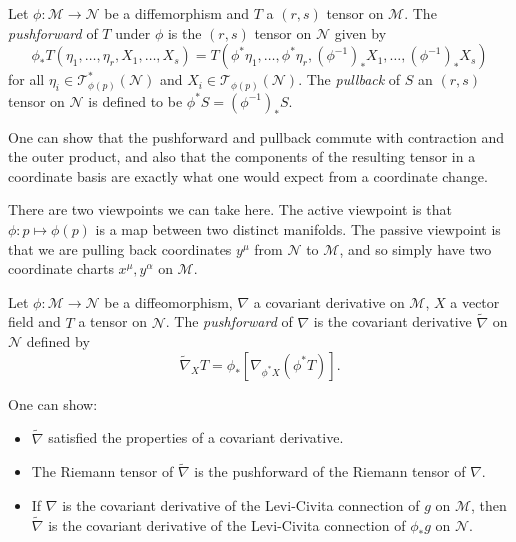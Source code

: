 \documentclass{jknotes}
\begin{document}
\begin{defn}
    Let \(\phi:\mathcal{M}\to\mathcal{N}\) be a diffemorphism and \(T\) a \((r,s)\) tensor on \(\mathcal{M}\). The \emph{pushforward} of \(T\) under \(\phi\) is the \((r,s)\) tensor on \(\mathcal{N}\) given by
    \begin{equation}
        \phi_*T(\eta_1,\dots,\eta_r,X_1,\dots,X_s) = T(\phi^*\eta_1,\dots,\phi^*\eta_r,(\phi^{-1})_*X_1,\dots,(\phi^{-1})_*X_s) 
    \end{equation}
    for all \(\eta_i\in\mathcal{T}_{\phi(p)}^*(\mathcal{N})\) and \(X_i\in\mathcal{T}_{\phi(p)}(\mathcal{N})\). The \emph{pullback} of \(S\) an \((r,s)\) tensor on \(\mathcal{N}\) is defined to be \(\phi^*S = (\phi^{-1})_*S\).
\end{defn}
One can show that the pushforward and pullback commute with contraction and the outer product, and also that the components of the resulting tensor in a coordinate basis are exactly what one would expect from a coordinate change.

There are two viewpoints we can take here. The active viewpoint is that \(\phi:p\mapsto\phi(p)\) is a map between two distinct manifolds. The passive viewpoint is that we are pulling back coordinates \(y^\mu\) from \(\mathcal{N}\) to \(\mathcal{M}\), and so simply have two coordinate charts \(x^\mu,y^\alpha\) on \(\mathcal{M}\).

\begin{defn}
    Let \(\phi:\mathcal{M}\to\mathcal{N}\) be a diffeomorphism, \(\nabla\) a covariant derivative on \(\mathcal{M}\), \(X\) a vector field and \(T\) a tensor on \(\mathcal{N}\). The \emph{pushforward} of \(\nabla\) is the covariant derivative \(\tilde\nabla\) on \(\mathcal{N}\) defined by
    \begin{equation}
        \tilde\nabla_X T = \phi_*[\nabla_{\phi^*X}(\phi^*T)].
    \end{equation}
\end{defn}
One can show:
\begin{itemize}
    \item \(\tilde\nabla\) satisfied the properties of a covariant derivative.
    \item The Riemann tensor of \(\tilde\nabla\) is the pushforward of the Riemann tensor of \(\nabla\).
    \item If \(\nabla\) is the covariant derivative of the Levi-Civita connection of \(g\) on \(\mathcal{M}\), then \(\tilde\nabla\) is the covariant derivative of the Levi-Civita connection of \(\phi_*g\) on \(\mathcal{N}\).
\end{itemize}
\end{document}
